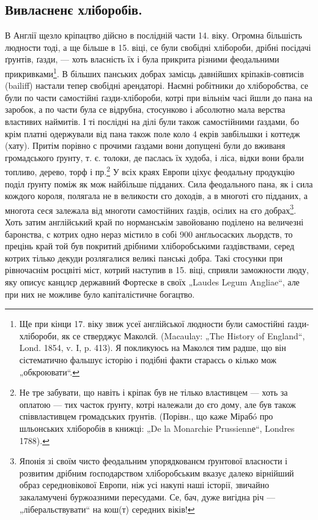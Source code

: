 \subsection{Вивласненє хліборобів.}

В Англії щезло кріпацтво дійсно в послідній части 14. віку. Огромна більшість людности тоді, а ще
більше в 15. віці, се були свобідні хлібороби, дрібні посідачі ґрунтів, ґазди, — хоть власність їх і
була прикрита різними феодальними прикривками\footnote{
Ще при кінци 17. віку звиж  усеї англійської людности були самостійні ґазди-хлібороби, як се
стверджує Маколєй. (Macaulay: „The History of England“, Lond. 1854, v. I, p. 413). Я покликуюсь на
Маколєя тим радше, що він сістематично фальшує історію і подібні факти стараєсь о кілько мож
„обкроювати“.
}. В більших панських добрах замісць давнійших
кріпаків-совтисів (bailiff) настали тепер свобідні арендаторі. Наємні робітники до хліборобства, се
були по части самостійні ґазди-хлібороби, котрі при вільнім часі йшли до пана на заробок, а по части
була се відрубна, стосунково і абсолютно мала верства властивих наймитів. І ті послідні на ділі були
також самостійними ґаздами, бо крім платні одержували від пана також поле коло 4 екрів завбільшки і
коттедж (хату). Притім порівно с прочими ґаздами вони допущені були до вживаня громадського ґрунту,
т. є. толоки, де паслась їх худоба, і ліса, відки вони брали топливо, дерево, торф і пр.\footnote{
Не тре забувати, що навіть і кріпак був не тілько властивцем — хоть за оплатою — тих часток
ґрунту, котрі належали до єго дому, але був також співвластивцем громадських ґрунтів. (Порівн., що
каже Мірабó про шльонських хліборобів в книжці: „De la Monarchie Prussiennе“, Londres 1788).
} У всіх краях Европи ціхує феодальну продукцію поділ ґрунту поміж як мож найбільше підданих. Сила
феодального пана, як і сила кождого короля, полягала не в великости єго доходів, а в многоті єго
підданих, а многота сеся залежала від многоти самостійних ґаздів, осілих на єго добрах\footnote{
Японія зі своїм чисто феодальним упорядкованєм ґрунтової власности і розвитим дрібним
ґосподарством хліборобським вказує далеко вірнійший образ середновікової Европи, ніж усі накупі наші
історії, звичайно закаламучені буржоазними пересудами. Се, бач, дуже вигідна річ —
„ліберальствувати“ на кош(т) середних віків!}. Хоть
затим англійський край по норманськім завойованю поділено на величезні баронства, с котрих одно
нераз містило в собі 900 анґльосаских льордств, то прецінь край той був покритий дрібними
хліборобськими ґаздівствами, серед котрих тілько декуди розлягалися великі панські добра. Такі
стосунки при рівночаснім росцвіті міст, котрий наступив в 15. віці, сприяли заможности люду, яку
описує канцлєр державний Фортеске в своїх „Laudes Legum Angliae“, але при них не можливе було
капіталістичне богацтво.
\par{}